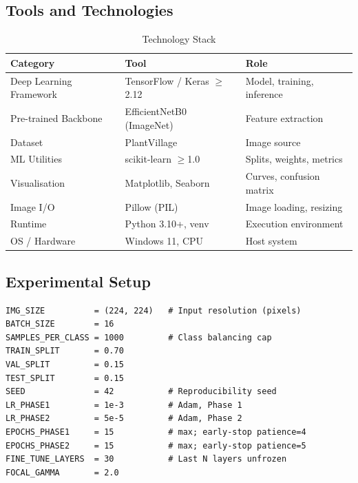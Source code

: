 \documentclass[12pt, a4paper, onecolumn]{IEEEtran}
\begin{document}
\subsection{Tools and Technologies}

\begin{table}[H]
  \centering
  \caption{Technology Stack}
  \label{tab:tools}
  \begin{tabularx}{\linewidth}{llX}
    \toprule
    \textbf{Category}        & \textbf{Tool}               & \textbf{Role} \\
    \midrule
    Deep Learning Framework  & TensorFlow / Keras $\geq$2.12 & Model, training, inference \\
    Pre-trained Backbone     & EfficientNetB0 (ImageNet)     & Feature extraction \\
    Dataset                  & PlantVillage                  & Image source \\
    ML Utilities             & scikit-learn $\geq$1.0        & Splits, weights, metrics \\
    Visualisation            & Matplotlib, Seaborn           & Curves, confusion matrix \\
    Image I/O                & Pillow (PIL)                  & Image loading, resizing \\
    Runtime                  & Python 3.10+, venv            & Execution environment \\
    OS / Hardware            & Windows 11, CPU               & Host system \\
    \bottomrule
  \end{tabularx}
\end{table}

\subsection{Experimental Setup}

\begin{lstlisting}[caption={Experimental Hyperparameter Configuration},
                   label={lst:config}]
IMG_SIZE          = (224, 224)   # Input resolution (pixels)
BATCH_SIZE        = 16
SAMPLES_PER_CLASS = 1000         # Class balancing cap
TRAIN_SPLIT       = 0.70
VAL_SPLIT         = 0.15
TEST_SPLIT        = 0.15
SEED              = 42           # Reproducibility seed
LR_PHASE1         = 1e-3         # Adam, Phase 1
LR_PHASE2         = 5e-5         # Adam, Phase 2
EPOCHS_PHASE1     = 15           # max; early-stop patience=4
EPOCHS_PHASE2     = 15           # max; early-stop patience=5
FINE_TUNE_LAYERS  = 30           # Last N layers unfrozen
FOCAL_GAMMA       = 2.0
\end{lstlisting}
\end{document}
